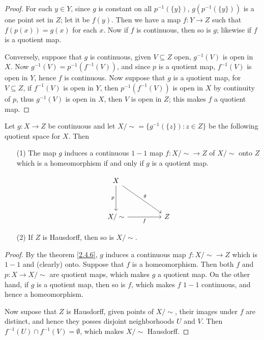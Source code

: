 \begin{proof}
    For each $y \in Y$, since  $g$ is constant on all  $p^{-1}(\{y\})$,
    $g(p^{-1}(\{y\}))$ is a one point set in $Z$; let it be $f(y)$. Then we have
    a map $f:Y \rightarrow Z$ such that $f(p(x))=g(x)$ for each $x$. Now if  $f$
    is continuous, then so is  $g$; likewise if  $f$ is a quotient map.

    Conversely, suppose that  $g$ is continuous, given  $V \subseteq Z$ open,
    $g^{-1}(V)$ is open in $X$. Now  $g^{-1}(V)=p^{-1}(f^{-1}(V))$, and since
    $p$ is a quotient map,  $f^{-1}(V)$ is open in $Y$, hence  $f$ is continuous.
    Now suppose that  $g$ is a quotient map, for  $V \subseteq Z$, if
    $f^{-1}(V)$ is open in $Y$, then  $p^{-1}(f^{-1}(V))$ is open in $X$ by
    continuity of  $p$, thus  $g^{-1}(V)$ is open in $X$, then  $V$ is open in
    $Z$; this makes  $f$ a quotient map.
\end{proof}
\begin{corollary}
    Let $g:X \rightarrow Z$ be continuous and let $X/\sim=\{g^{-1}(\{z\}):z \in
    Z\}$ be the following quotient space for $X$. Then
        \begin{enumerate}
            \item[(1)] The map $g$ induces a continuous  $1-1$ map  $f:X/\sim
                \rightarrow Z$ of  $X/\sim$ onto  $Z$ which is a homeomorphism
                if and only if $g$ is a quotient map.

                \[\begin{tikzcd}
	                X \\
	                \\
	                {X/\sim} && Z
	                \arrow["p"', from=1-1, to=3-1]
	                \arrow["f"', from=3-1, to=3-3]
	                \arrow["g", from=1-1, to=3-3]
                    \end{tikzcd}\]

            \item[(2)] If $Z$ is Hausdorff, then so is  $X/\sim$.
        \end{enumerate}
\end{corollary}
\begin{proof}
    By the theorem \ref{2.4.6}, $g$ induces a continuous map  $f:X/\sim
    \rightarrow Z$ which is $1-1$ and  (clearly) onto. Suppose that $f$ is a
    homeomorphism. Then both  $f$ and  $p:X \rightarrow X/\sim$ are quotient
    maps, which makes  $g$ a quotient map. On the other hand, if $g$ is a
    quotient map, then so is  $f$, which makes  $f$  $1-1$ continuous, and hence
    a homeomorphism.

    Now supose that  $Z$ is Hausdorff, given points of  $X/\sim$, their images
    under  $f$ are distinct, and hence they posses disjoint neighborhoods  $U$
    and $V$. Then  $f^{-1}(U) \cap f^{-1}(V)=\emptyset$, which makes $X/\sim$
    Hausdorff.
\end{proof}
